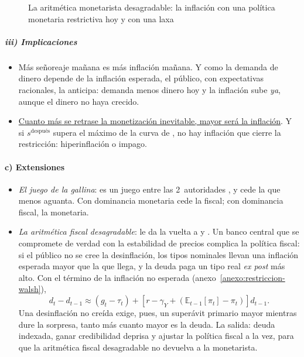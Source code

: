 \documentclass[11pt]{article}
\begin{document}
\begin{figure}[H]
\centering
\caption{La aritmética monetarista desagradable: la inflación con una política monetaria restrictiva hoy y con una laxa}\label{fig:aritmetica}
\end{figure}

\subparagraph{iii) Implicaciones}

\begin{itemize}
\item Más señoreaje mañana es más inflación mañana. Y como la demanda de dinero depende de la inflación esperada, el público, con expectativas racionales, la anticipa: demanda menos dinero hoy y la inflación sube \emph{ya}, aunque el dinero no haya crecido.
\item \uline{Cuanto más se retrase la monetización inevitable, mayor será la inflación}. Y si $s^{\text{después}}$ supera el máximo de la curva de , no hay inflación que cierre la restricción: hiperinflación o impago.
\end{itemize}

\paragraph{c) Extensiones}

\begin{itemize}
\item \emph{El juego de la gallina}: es un juego entre las 2~autoridades , y cede la que menos aguanta. Con dominancia monetaria cede la fiscal; con dominancia fiscal, la monetaria.
\item \emph{La aritmética fiscal desagradable}: \textcite{King1995Commentary} le da la vuelta a  y . Un banco central que se compromete de verdad con la estabilidad de precios complica la política fiscal: si el público no se cree la desinflación, los tipos nominales llevan una inflación esperada mayor que la que llega, y la deuda paga un tipo real \emph{ex post} más alto. Con el término de la inflación no esperada (anexo~\ref{anexo:restriccion-walsh}),
  \begin{equation*}
  d_t-d_{t-1}\approx(g_t-\tau_t)+\left[r-\gamma_Y+\left(\mathbb{E}_{t-1}[\pi_t]-\pi_t\right)\right]d_{t-1} .
  \end{equation*}
  Una desinflación no creída exige, pues, un superávit primario mayor mientras dure la sorpresa, tanto más cuanto mayor es la deuda. La salida: deuda indexada, ganar credibilidad deprisa y ajustar la política fiscal a la vez, para que la aritmética fiscal desagradable no devuelva a la monetarista.
\end{itemize}
\end{document}
